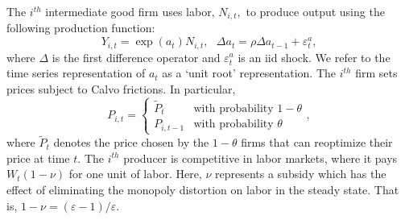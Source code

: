 \documentclass[12pt,thmsa]{article}
\begin{document}
The $i^{th}$ intermediate good firm uses labor, $N_{i,t},$ to produce output
using the following production function:%
\begin{equation*}
Y_{i,t}=\exp \left( a_{t}\right) N_{i,t},\text{ }\Delta a_{t}=\rho \Delta
a_{t-1}+\varepsilon _{t}^{a},
\end{equation*}%
where $\Delta $ is the first difference operator and $\varepsilon _{t}^{a}$
is an iid shock. We refer to the time series representation of $a_{t}$ as a
`unit root' representation. The $i^{th}$ firm sets prices subject to Calvo
frictions. In particular,%
\begin{equation*}
P_{i,t}=\left\{ 
\begin{array}{cc}
\tilde{P}_{t} & \text{with probability }1-\theta \\ 
P_{i,t-1} & \text{with probability }\theta%
\end{array}%
\right. ,
\end{equation*}%
where $\tilde{P}_{t}$ denotes the price chosen by the $1-\theta $ firms that
can reoptimize their price at time $t.$ The $i^{th}$ producer is competitive
in labor markets, where it pays $W_{t}\left( 1-\nu \right) $ for one unit of
labor. Here, $\nu $ represents a subsidy which has the effect of eliminating
the monopoly distortion on labor in the steady state. That is, $1-\nu
=\left( \varepsilon -1\right) /\varepsilon .$
\end{document}
